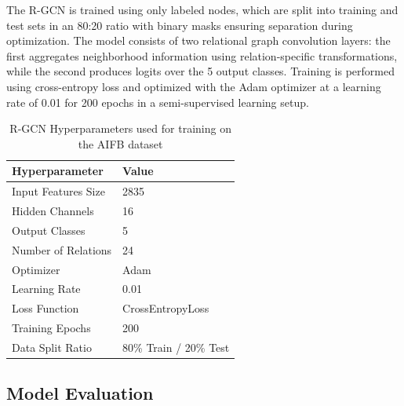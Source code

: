 \documentclass[runningheads]{llncs}
\begin{document}
The R-GCN is trained using only labeled nodes, which are split into training and test sets in an 80:20 ratio with binary masks ensuring separation during optimization. The model consists of two relational graph convolution layers: the first aggregates neighborhood information using relation-specific transformations, while the second produces logits over the 5 output classes. Training is performed using cross-entropy loss and optimized with the Adam optimizer at a learning rate of 0.01 for 200 epochs in a semi-supervised learning setup.
\begin{table}[h]
\centering
\caption{R-GCN Hyperparameters used for training on the AIFB dataset}
\begin{tabular}{ll}
\hline
\textbf{Hyperparameter} & \textbf{Value} \\
\hline
Input Features Size & 2835 \\
Hidden Channels & 16 \\
Output Classes & 5 \\
Number of Relations & 24 \\
Optimizer & Adam \\
Learning Rate & 0.01 \\
Loss Function & CrossEntropyLoss \\
Training Epochs & 200 \\
Data Split Ratio & 80\% Train / 20\% Test \\
\hline
\end{tabular}
\label{tab:hyperparameters}
\end{table}

\subsection{Model Evaluation}
\end{document}
